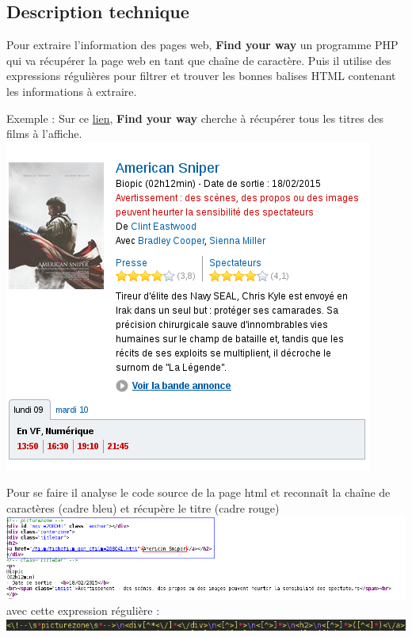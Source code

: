\documentclass[10pt,a4paper]{report}
\begin{document}
\subsection{Description technique}
\begin{flushleft}
Pour extraire l'information des pages web, \textbf{Find your way} un programme PHP qui va récupérer la page web en tant que chaîne de caractère. Puis il utilise des expressions régulières pour filtrer et trouver les bonnes balises HTML contenant les informations à extraire.\newline

Exemple :
 Sur ce \href{http://www.allocine.fr/seance/salle_gen_csalle=P0231.html}{lien}, \textbf{Find your way} cherche à récupérer tous les titres des films à l'affiche. \\
 \includegraphics[scale=0.45]{./images/allocine_img1.png}
 
 Pour se faire il analyse le code source de la page html et reconnaît la chaîne de caractères (cadre bleu)  et récupère le titre (cadre rouge)\\
  \includegraphics[scale=0.45]{./images/allocine_img2.png}
 avec cette expression régulière : \\
 \includegraphics[scale=0.45]{./images/allocine_img3.png}
\end{flushleft}
\end{document}
